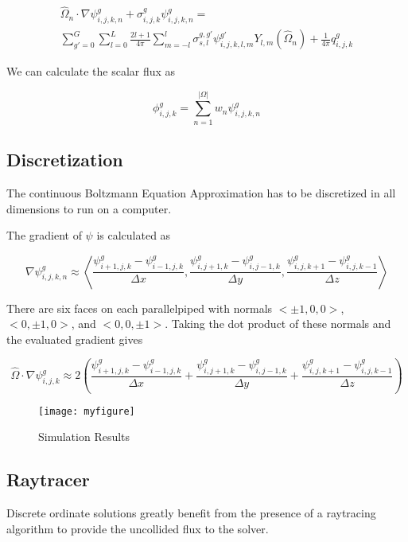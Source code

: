 \documentclass{article}
\numberwithin{equation}{subsection}
\begin{document}
\begin{equation}\label{eq_discretized}
\begin{split}
\hat{\Omega}_n \cdot \nabla\psi_{i,j,k,n}^g + \sigma_{i,j,k}^g \psi_{i,j,k,n}^g = \\
\sum_{g' = 0}^G \sum_{l=0}^L \frac{2l+1}{4 \pi} \sum_{m=-l}^l \sigma_{s,l}^{g,g'}\psi_{i,j,k,l,m}^{g'}Y_{l,m}(\hat{\Omega}_n) + \frac{1}{4 \pi}q_{i,j,k}^g
\end{split}
\end{equation}

We can calculate the scalar flux as

\begin{equation}
\phi_{i,j,k}^g = \sum_{n=1}^{|\Omega|} w_n \psi_{i,j,k,n}^g
\end{equation}

\subsection{Discretization}
The continuous Boltzmann Equation Approximation has to be discretized in all dimensions to run on a computer.

The gradient of $\psi$ is calculated as

\begin{equation}
\nabla \psi_{i,j,k,n}^g \approx
\left\langle  
\frac{\psi_{i+1,j,k}^g - \psi_{i-1,j,k}^g}{\Delta x},
\frac{\psi_{i,j+1,k}^g - \psi_{i,j-1,k}^g}{\Delta y},
\frac{\psi_{i,j,k+1}^g - \psi_{i,j,k-1}^g}{\Delta z}
\right\rangle
\end{equation}

There are six faces on each parallelpiped with normals $<\pm 1, 0, 0>$, $<0, \pm 1, 0>$, and $<0, 0, \pm 1>$. Taking the dot product of these normals and the evaluated gradient gives

\begin{equation}
\hat{\Omega} \cdot \nabla \psi_{i,j,k}^g \approx
2 \left(
\frac{\psi_{i+1,j,k}^g - \psi_{i-1,j,k}^g}{\Delta x} +
\frac{\psi_{i,j+1,k}^g - \psi_{i,j-1,k}^g}{\Delta y} +
\frac{\psi_{i,j,k+1}^g - \psi_{i,j,k-1}^g}{\Delta z}
\right)
\end{equation}

\begin{figure}
    \centering
    \texttt{[image: myfigure]}
    \caption{Simulation Results}
    \label{simulationfigure}
\end{figure}

\subsection{Raytracer}
Discrete ordinate solutions greatly benefit from the presence of a raytracing algorithm to provide the uncollided flux to the solver.
\end{document}

